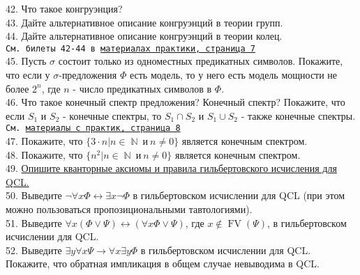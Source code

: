 \documentclass[a4paper,100pt]{article}
\theoremstyle{indented}
\theoremstyle{definition}
\theoremstyle{remark}
\DeclareMathOperator{\ra}{\rightarrow}
\DeclareMathOperator{\NN}{\mathbb{N}}
\DeclareMathOperator{\FV}{FV}
\begin{document}
42. %
{Что такое конгруэнция?} \\ 

43. %
{Дайте альтернативное описание конгруэнций в теории групп.} \\ 

44. %
{Дайте альтернативное описание конгруэнций в теории колец.} \\ 

\texttt{См. билеты 42-44 в \href{http://www.mi-ras.ru/~speranski/courses/logic-1-2021-spring/exercises.pdf}{материалах практики, страница 7}} \\ 

45. %
{Пусть $\sigma$ состоит только из одноместных предикатных символов. Покажите, что если у $\sigma$-предложения $\Phi$ есть модель, то у него есть модель мощности не более $2^n$, где $n$ - число предикатных символов в $\Phi$.} \\ 

46. %
{Что такое конечный спектр предложения? Конечный спектр? Покажите, что если $S_1$ и $S_2$ - конечные спектры, то $S_1 \cap S_2$ и $S_1 \cup S_2$ - также конечные спектры.} \\ 

\texttt{См. \href{http://www.mi-ras.ru/~speranski/courses/logic-1-2021-spring/exercises.pdf}{материалы с практик, страница 8}} \\ 

47. %
{Покажите, что $\{3 \cdot n | n \in \NN \: и \: n \neq 0\}$ является конечным спектром.} \\

48. %
{Покажите, что $\{n^2 | n \in \NN \: и \: n \neq 0\}$ является конечным спектром.} \\

49. \hyperlink{b49}{Опишите кванторные аксиомы и правила гильбертовского исчисления для QCL.} \\

50. %
{Выведите $\neg \forall x \Phi \leftrightarrow \exists x \neg \Phi$ в гильбертовском исчислении для QCL (при этом можно пользоваться пропозициональными тавтологиями).} \\ 

51. %
{Выведите $\forall x (\Phi \vee \Psi) \leftrightarrow (\forall x \Phi \vee \Psi)$, где $x \notin \FV (\Psi)$, в гильбертовском исчислении для QCL.} \\ 

52. %
{Выведите $\exists y \forall x \Psi \ra \forall x \exists y \Phi$ в гильбертовском исчислении для QCL. Покажите, что обратная импликация в общем случае невыводима в QCL.} \\ 
\end{document}
